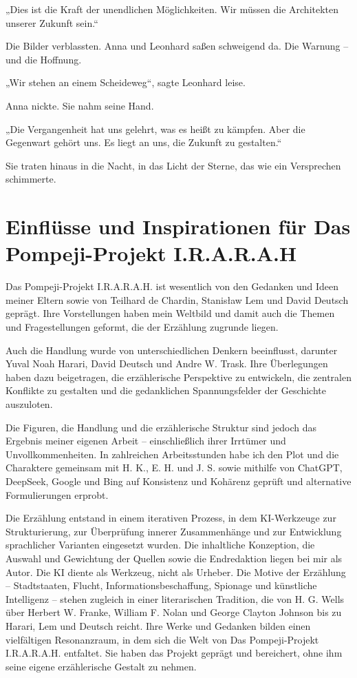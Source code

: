 \documentclass[
]{article}
\begin{document}
„Dies ist die Kraft der unendlichen Möglichkeiten. Wir müssen die Architekten unserer Zukunft sein.``

Die Bilder verblassten. Anna und Leonhard saßen schweigend da. Die Warnung -- und die Hoffnung.

„Wir stehen an einem Scheideweg``, sagte Leonhard leise.

Anna nickte. Sie nahm seine Hand.

„Die Vergangenheit hat uns gelehrt, was es heißt zu kämpfen. Aber die Gegenwart gehört uns. Es liegt an uns, die Zukunft zu gestalten.``

Sie traten hinaus in die Nacht, in das Licht der Sterne, das wie ein Versprechen schimmerte.

\section{Einflüsse und Inspirationen für Das Pompeji-Projekt I.R.A.R.A.H}\label{einfluxfcsse-und-inspirationen-fuxfcr-das-pompeji-projekt-i.r.a.r.a.h}

Das Pompeji-Projekt I.R.A.R.A.H. ist wesentlich von den Gedanken und Ideen meiner Eltern sowie von Teilhard de Chardin, Stanisław Lem und David Deutsch geprägt. Ihre Vorstellungen haben mein Weltbild und damit auch die Themen und Fragestellungen geformt, die der Erzählung zugrunde liegen.

Auch die Handlung wurde von unterschiedlichen Denkern beeinflusst, darunter Yuval Noah Harari, David Deutsch und Andre W. Trask. Ihre Überlegungen haben dazu beigetragen, die erzählerische Perspektive zu entwickeln, die zentralen Konflikte zu gestalten und die gedanklichen Spannungsfelder der Geschichte auszuloten.

Die Figuren, die Handlung und die erzählerische Struktur sind jedoch das Ergebnis meiner eigenen Arbeit – einschließlich ihrer Irrtümer und Unvollkommenheiten. In zahlreichen Arbeitsstunden habe ich den Plot und die Charaktere gemeinsam mit H. K., E. H. und J. S. sowie mithilfe von ChatGPT, DeepSeek, Google und Bing auf Konsistenz und Kohärenz geprüft und alternative Formulierungen erprobt.

Die Erzählung entstand in einem iterativen Prozess, in dem KI-Werkzeuge zur Strukturierung, zur Überprüfung innerer Zusammenhänge und zur Entwicklung sprachlicher Varianten eingesetzt wurden. Die inhaltliche Konzeption, die Auswahl und Gewichtung der Quellen sowie die Endredaktion liegen bei mir als Autor. Die KI diente als Werkzeug, nicht als Urheber.
Die Motive der Erzählung – Stadtstaaten, Flucht, Informationsbeschaffung, Spionage und künstliche Intelligenz – stehen zugleich in einer literarischen Tradition, die von H. G. Wells über Herbert W. Franke, William F. Nolan und George Clayton Johnson bis zu Harari, Lem und Deutsch reicht. Ihre Werke und Gedanken bilden einen vielfältigen Resonanzraum, in dem sich die Welt von Das Pompeji-Projekt I.R.A.R.A.H. entfaltet. Sie haben das Projekt geprägt und bereichert, ohne ihm seine eigene erzählerische Gestalt zu nehmen.
\end{document}
